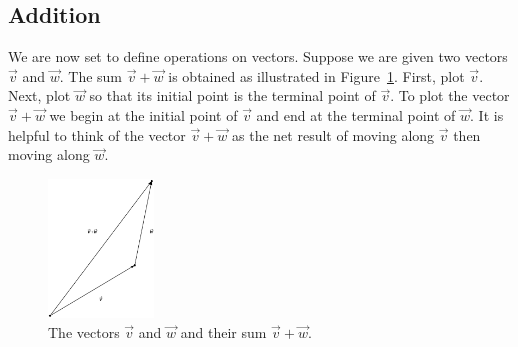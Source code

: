 \subsection{Addition}
We are now set to define operations on vectors.  Suppose we are given two vectors $\vec{v}$ and $\vec{w}$.  The sum $\vec{v} + \vec{w}$ is obtained as illustrated in Figure~\ref{fig_vector_2}.  First, plot $\vec{v}$.  Next, plot $\vec{w}$ so that its initial point is the terminal point of $\vec{v}$.  To plot the vector $\vec{v} + \vec{w}$ we begin at the initial point of $\vec{v}$ and end at the terminal point of $\vec{w}$.  It is helpful to think of the vector $\vec{v} + \vec{w}$ as the net result of moving along $\vec{v}$ then moving along $\vec{w}$. 

\begin{figure}
	\begin{center}
			\includegraphics[width=0.25\textwidth]{fig_vector_2}
	\caption{The vectors $\vec{v}$ and $\vec{w}$ and their sum $\vec{v}+\vec{w}$. }
	\label{fig_vector_2}
	\end{center}
\end{figure}

